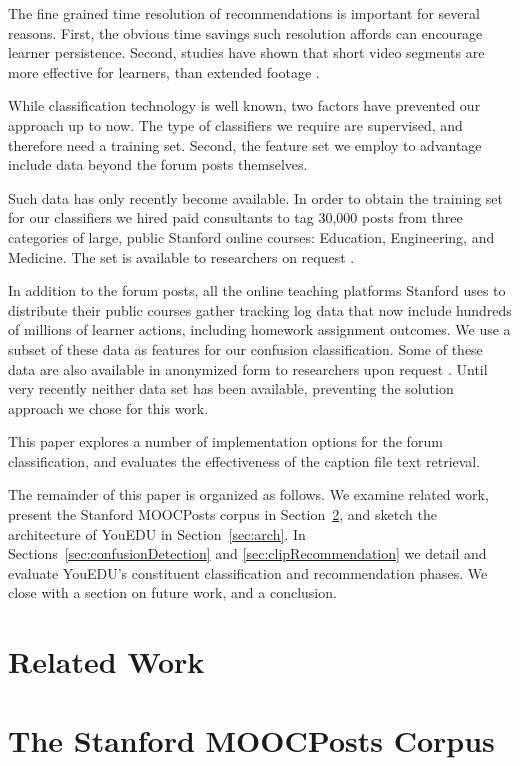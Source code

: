 \documentclass{edm_template}
\begin{document}
The fine grained time resolution of recommendations is important for
several reasons. First, the obvious time savings such resolution
affords can encourage learner persistence. Second, studies have shown
that short video segments are more effective for learners, than
extended footage \cite{Guo:2014:VPA:2556325.2566239}.

While classification technology is well known, two factors have
prevented our approach up to now. The type of classifiers we require
are supervised, and therefore need a training set. Second, the feature
set we employ to advantage include data beyond the forum posts
themselves. 

Such data has only recently become available. In order to obtain the
training set for our classifiers we hired paid consultants to tag
30,000 posts from three categories of large, public Stanford online
courses: Education, Engineering, and Medicine. The set is available to
researchers on request \cite{stanfordMOOCPosts}.

In addition to the forum posts, all the online teaching platforms
Stanford uses to distribute their public courses gather tracking log
data that now include hundreds of millions of learner actions,
including homework assignment outcomes. We use a subset of these data
as features for our confusion classification. Some of these data are
also available in anonymized form to researchers upon request
\cite{stanfordDataApps}. Until very recently neither data set has been
available, preventing the solution approach we chose for this
work.

This paper explores a number of implementation options for the forum
classification, and evaluates the effectiveness of the caption file
text retrieval.

The remainder of this paper is organized as follows. We examine
related work, present the Stanford MOOCPosts corpus in
Section~\ref{sec:MOOCPosts}, and sketch the architecture of YouEDU in
Section~\ref{sec:arch}.  In Sections~\ref{sec:confusionDetection} and
\ref{sec:clipRecommendation} we detail and evaluate YouEDU's constituent
classification and recommendation phases. We close with a section on
future work, and a conclusion.

\section{Related Work}
\label{sec:relWork}

\section{The Stanford MOOCPosts Corpus}
\label{sec:MOOCPosts}
\end{document}
